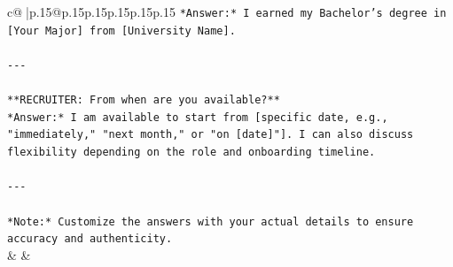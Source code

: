 \documentclass{article}
\begin{document}
{\begin{supertabular}{c@{$\;$}|p{.15\linewidth}@{}p{.15\linewidth}p{.15\linewidth}p{.15\linewidth}p{.15\linewidth}p{.15\linewidth}}
{{{\texttt{*Answer:* I earned my Bachelor’s degree in {[}Your Major{]} from {[}University Name{]}.} \\
\\ 
\texttt{{-}{-}{-}} \\
\\ 
\texttt{**RECRUITER: From when are you available?**  } \\
\texttt{*Answer:* I am available to start from {[}specific date, e.g., "immediately," "next month," or "on {[}date{]}"{]}. I can also discuss flexibility depending on the role and onboarding timeline.} \\
\\ 
\texttt{{-}{-}{-}} \\
\\ 
\texttt{*Note:* Customize the answers with your actual details to ensure accuracy and authenticity.} \\
            }
        }
    }
    & & \\ \\


\end{supertabular}}
\end{document}
